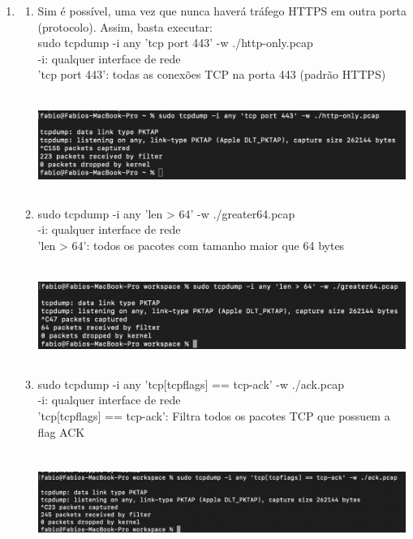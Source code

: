 \documentclass[12pt,a4paper]{report}
\begin{document}
\begin{enumerate}
    \item 
    \begin{enumerate}
        \item Sim é possível, uma vez que nunca haverá tráfego HTTPS em outra porta (protocolo). Assim, basta executar:
        \\
        sudo tcpdump -i any 'tcp port 443' -w ./http-only.pcap
        \\
        -i: qualquer interface de rede
        \\
        'tcp port 443': todas as conexões TCP na porta 443 (padrão HTTPS)
        \\
        \\
        \includegraphics[width=12cm, height=3cm]{6a.png}
        \item sudo tcpdump -i any 'len > 64' -w ./greater64.pcap
        \\
        -i: qualquer interface de rede
        \\
        'len > 64': todos os pacotes com tamanho maior que 64 bytes
        \\
        \\
        \includegraphics[width=12cm, height=3cm]{6b.png}
        \item sudo tcpdump -i any 'tcp[tcpflags] == tcp-ack' -w ./ack.pcap
        \\
        -i: qualquer interface de rede
        \\
        'tcp[tcpflags] == tcp-ack': Filtra todos os pacotes TCP que possuem a flag ACK
        \\
        \\
        \includegraphics[width=12cm, height=3cm]{6c.png}
    \end{enumerate}
    

\end{enumerate}
\end{document}
